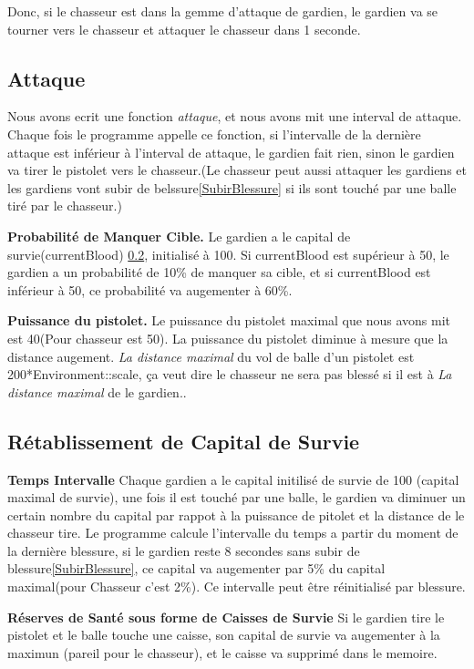 \documentclass{article}
\begin{document}
Donc, si le chasseur est dans la gemme d'attaque de gardien, le gardien va se tourner vers le chasseur et attaquer le chasseur dans 1 seconde.

\subsection{Attaque}
\label{attaque}
Nous avons ecrit une fonction \textsl{attaque}, et nous avons mit une interval de attaque. Chaque fois le programme appelle ce fonction, si l'intervalle de la dernière attaque est inférieur à l'interval de attaque, le gardien fait rien, sinon le gardien va tirer le pistolet vers le chasseur.(Le chasseur peut aussi attaquer les gardiens et les gardiens vont subir de belssure\ref{SubirBlessure} si ils sont touché par une balle tiré par le chasseur.)

\textbf{Probabilité de Manquer Cible.} Le gardien a le capital de survie(currentBlood) \ref{CapitalSurvie}, initialisé à 100. Si currentBlood est supérieur à 50, le gardien a un probabilité de 10\% de manquer sa cible, et si currentBlood est inférieur à 50, ce probabilité va augementer à 60\%.

\textbf{Puissance du pistolet.} Le puissance du pistolet maximal que nous avons mit est 40(Pour chasseur est 50). La puissance du pistolet diminue à mesure que la distance augement. \textsl{La distance maximal} du vol de balle d'un pistolet est 200*Environment::scale, ça veut dire le chasseur ne sera pas blessé si il est à \textsl{La distance maximal} de le gardien..

\subsection{Rétablissement de Capital de Survie}
\label{CapitalSurvie}
\textbf{Temps Intervalle} Chaque gardien a le capital initilisé de survie de 100 (capital maximal de survie), une fois il est touché par une balle, le gardien va diminuer un certain nombre du capital par rappot à la puissance de pitolet et la distance de le chasseur tire. Le programme calcule l'intervalle du temps a partir du moment de la dernière blessure, si le gardien reste 8 secondes sans subir de blessure\ref{SubirBlessure}, ce capital va augementer par 5\% du capital maximal(pour Chasseur c'est 2\%). Ce intervalle peut être réinitialisé par blessure.

\textbf{Réserves de Santé sous forme de Caisses de Survie} Si le gardien tire le pistolet et le balle touche une caisse, son capital de survie va augementer à la maximun (pareil pour le chasseur), et le caisse va supprimé dans le memoire.
\end{document}
